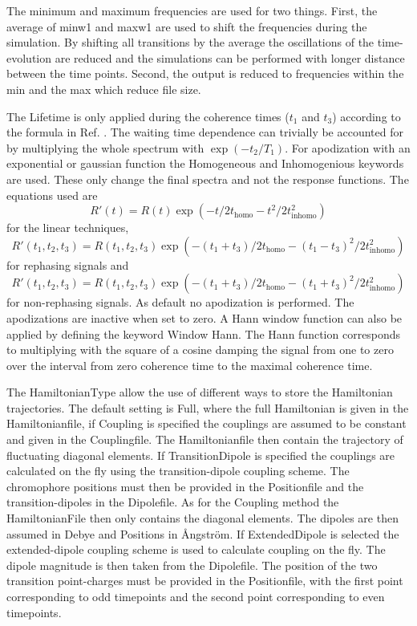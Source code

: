The minimum and maximum frequencies are used for two things. First, the average of
minw1 and maxw1 are used to shift the frequencies during the simulation. By shifting
all transitions by the average the oscillations of the time-evolution are reduced and
the simulations can be performed with longer distance between the time points. Second,
the output is reduced to frequencies within the min and the max which reduce file size.

The Lifetime is only applied during the coherence times ($t_1$ and $t_3$) according 
to the formula in Ref. . The waiting time dependence
can trivially be accounted for by  multiplying the whole spectrum with
$\exp( -t_2 /T_1 )$. For apodization with an exponential or gaussian function the
Homogeneous and Inhomogenious keywords are used. These only change the final spectra
and not the response functions. The equations used are
\begin{equation}
R'(t)=R(t)\exp\left(-t/2 t_{\textrm{homo}}-t^2/2 t_{\textrm{inhomo}}^2\right)
\end{equation}
for the linear techniques,
\begin{equation}
R'(t_1,t_2,t_3)=R(t_1,t_2,t_3)\exp\left(-(t_1+t_3)/2 t_{\textrm{homo}}-(t_1-t_3)^2/2 t_{\textrm{inhomo}}^2\right)
\end{equation}
for rephasing signals and
\begin{equation}
R'(t_1,t_2,t_3)=R(t_1,t_2,t_3)
\exp\left(-(t_1+t_3)/2 t_{\textrm{homo}}-(t_1+t_3)^2/2 t_{\textrm{inhomo}}^2\right)
\end{equation}
for non-rephasing signals. As default no apodization is performed. The apodizations
are inactive when set to zero. A Hann window function can also be applied by defining
the keyword Window Hann. The Hann function corresponds to multiplying with the square
of a cosine damping the signal from one to zero over the interval from zero coherence
time to the maximal coherence time.

The HamiltonianType allow the use of different ways to store the Hamiltonian
trajectories. The default setting is Full, where the full Hamiltonian is given in
the Hamiltonianfile, if Coupling is specified the couplings are assumed to be constant
and given in the Couplingfile. The Hamiltonianfile then contain the trajectory of
fluctuating diagonal elements. If TransitionDipole is specified the couplings are
calculated on the fly using the transition-dipole coupling scheme. The chromophore
positions must then be provided in the Positionfile and the transition-dipoles in the
Dipolefile. As for the Coupling method the HamiltonianFile then only contains the
diagonal elements. The dipoles are then assumed in Debye and Positions in
\AA ngstr\"{o}m. If ExtendedDipole is selected the extended-dipole coupling scheme
is used to calculate coupling on the fly. The dipole magnitude is then taken from
the Dipolefile. The position of the two transition point-charges must be provided in
the Positionfile, with the first point corresponding to odd timepoints and the second
point corresponding to even timepoints.

